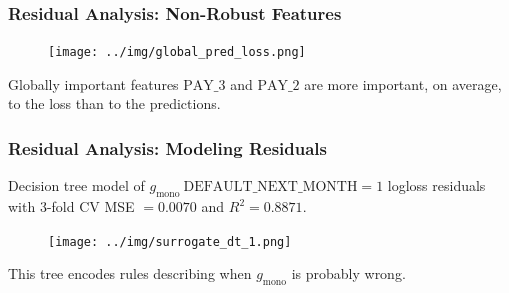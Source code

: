 \documentclass[11pt,
               aspectratio=169,
               hyperref={colorlinks}
               ]{beamer}
\begin{document}
		
		

			\begin{frame}[t]
		
				\frametitle{\large{\textbf{Residual Analysis}: Non-Robust Features}}
				\vspace{-10pt}
				\begin{figure}
					\begin{center}
						\texttt{[image: ../img/global\_pred\_loss.png]}
					\end{center}
				\end{figure}
				\vspace{-8pt}	
				\scriptsize{Globally important features $\text{PAY\_3}$ and $\text{PAY\_2}$ are more important, on average, to the loss than to the predictions.} 
		
			\end{frame}

			\begin{frame}[t]
		
				\frametitle{\textbf{Residual Analysis}: Modeling Residuals}
				Decision tree model of $g_{\text{mono}} ~\text{DEFAULT\_NEXT\_MONTH} =1$ logloss residuals with 3-fold CV MSE $=0.0070$ and $R^2=0.8871$.
				\begin{figure}
					\begin{center}
						\texttt{[image: ../img/surrogate\_dt\_1.png]}
					\end{center}
				\end{figure}	
				This tree encodes rules describing when $g_{\text{mono}}$ is probably wrong.
			\end{frame}
			
\end{document}
